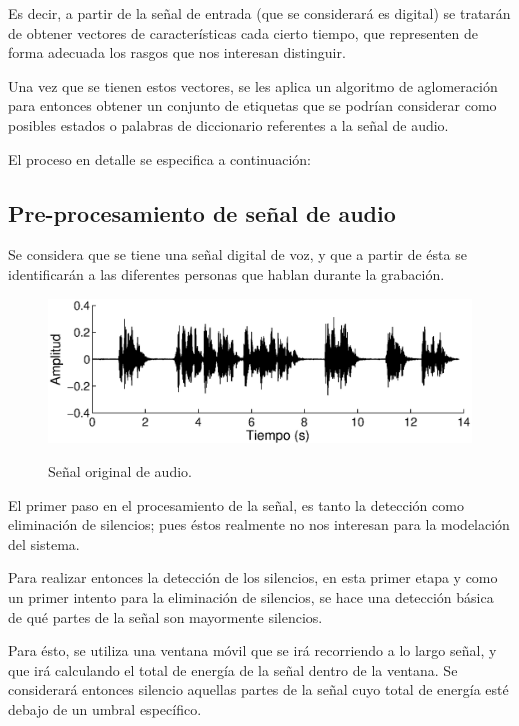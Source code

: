 Es decir, a partir de la señal de entrada (que se considerará es digital) se tratarán de obtener vectores de características cada cierto tiempo, que representen de forma adecuada los rasgos que nos interesan distinguir.

Una vez que se tienen estos vectores, se les aplica un algoritmo de aglomeración para entonces obtener un conjunto de etiquetas que se podrían considerar como posibles estados o palabras de diccionario referentes a la señal de audio.

El proceso en detalle se especifica a continuación: 

\subsection{Pre-procesamiento de señal de audio}

Se considera que se tiene una señal digital de voz, y que a partir de ésta se identificarán a las diferentes personas que hablan durante la grabación.

\begin{figure}[ht]
  {\includegraphics[width=0.9\linewidth]{gfx/chap2/signal0}} \quad
  \caption{Señal original de audio.}
  \label{fig:sign_orig}
\end{figure}

El primer paso en el procesamiento de la señal, es tanto la detección como eliminación de silencios; pues éstos realmente no nos interesan para la modelación del sistema.


Para realizar entonces la detección de los silencios, en esta primer etapa y como un primer intento para la eliminación de silencios, se hace una detección básica de qué partes de la señal son mayormente silencios.

Para ésto, se utiliza una ventana móvil que se irá recorriendo a lo largo señal, y que irá calculando el total de energía de la señal dentro de la ventana. Se considerará entonces silencio aquellas partes de la señal cuyo total de energía esté debajo de un umbral específico.

